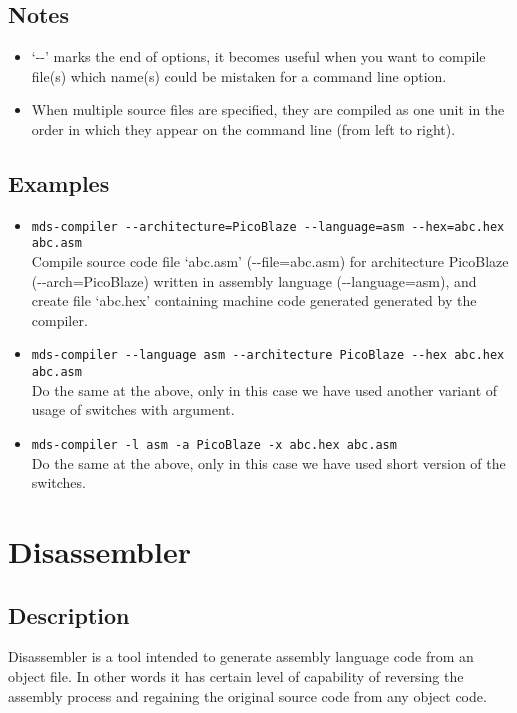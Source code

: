     \subsection{Notes}
        \begin{itemize}
            \item `-{}-' marks the end of options, it becomes useful when you want to compile file(s) which name(s) could be mistaken for a command line option.
            \item When multiple source files are specified, they are compiled as one unit in the order in which they appear on the command line (from left to right).
        \end{itemize}

    \subsection{Examples}
        \begin{itemize}
            \item \verb'mds-compiler --architecture=PicoBlaze --language=asm --hex=abc.hex abc.asm'\\
                Compile source code file `abc.asm' (-{}-file=abc.asm) for architecture PicoBlaze (-{}-arch=PicoBlaze) written in assembly language (-{}-language=asm), and create file `abc.hex' containing machine code generated generated by the compiler.

            \item \verb'mds-compiler --language asm --architecture PicoBlaze --hex abc.hex abc.asm'\\
                Do the same at the above, only in this case we have used another variant of usage of switches with argument.

            \item \verb'mds-compiler -l asm -a PicoBlaze -x abc.hex abc.asm'\\
                Do the same at the above, only in this case we have used short version of the switches.
        \end{itemize}

\section{Disassembler}
    \subsection{Description}
        Disassembler is a tool intended to generate assembly language code from an object file. In other words it has certain level of capability of reversing the assembly process and regaining the original source code from any object code.

